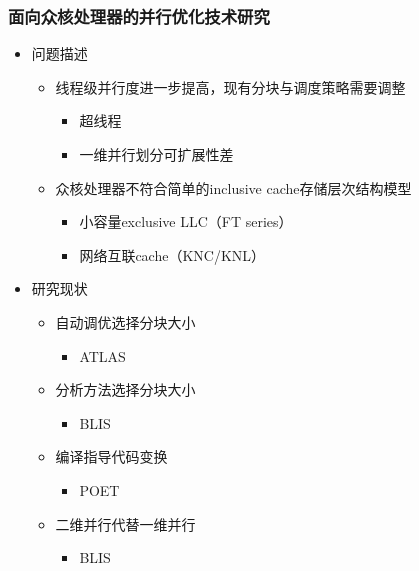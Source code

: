 \documentclass[aspectratio=169]{beamer}
\begin{document}
\begin{frame}
  \frametitle{面向众核处理器的并行优化技术研究}
  \begin{itemize}
  \item 问题描述
    \begin{itemize}
    \item 线程级并行度进一步提高，现有分块与调度策略需要调整
      \begin{itemize}
      \item 超线程
      \item 一维并行划分可扩展性差
      \end{itemize}
    \item 众核处理器不符合简单的inclusive cache存储层次结构模型
      \begin{itemize}
      \item 小容量exclusive LLC（FT series）
      \item 网络互联cache（KNC/KNL）
      \end{itemize}
    \end{itemize}
  \item 研究现状
    \begin{itemize}
    \item 自动调优选择分块大小
      \begin{itemize}
      \item ATLAS
      \end{itemize}
    \item 分析方法选择分块大小
      \begin{itemize}
      \item BLIS
      \end{itemize}
    \item 编译指导代码变换
      \begin{itemize}
      \item POET
      \end{itemize}
    \item 二维并行代替一维并行
      \begin{itemize}
      \item BLIS
      \end{itemize}
    \end{itemize}
  \end{itemize}
\end{frame}
\end{document}
